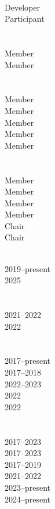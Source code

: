 \documentclass[10pt]{designcv}
\begin{document}
\begin{minipage}[t]{0.125\textwidth} 
\ \\
Developer\\
Participant\\
\ \\
\ \\
Member\\
Member\\
\ \\
\ \\
Member\\
Member\\
Member\\
Member\\
Member\\
\ \\
\ \\
Member\\
Member\\
Member\\
Member\\
Chair\\
Chair\\
\end{minipage}
\hfill
\begin{minipage}[t]{0.15\textwidth}
\ \\
2019--present\\
2025\\
\ \\
\ \\
2021--2022\\
2022\\
\ \\
\ \\
2017--present\\
2017--2018\\
2022--2023\\
2022\\
2022\\
\ \\
\ \\
2017--2023\\
2017--2023\\
2017--2019\\
2021--2022\\
2023--present\\
2024--present\\
\end{minipage}
\hfill

\end{document}
